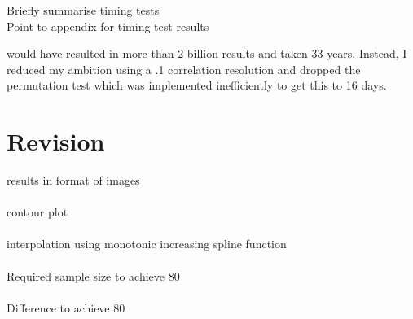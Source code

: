 Briefly summarise timing tests
\\
Point to appendix for timing test results

would have resulted in more than 2 billion results and taken 33 years.  Instead, I reduced my ambition using a .1 correlation resolution and dropped the permutation test which was implemented inefficiently to get this to 16 days.

\section{Revision}
  
results in format of images
\\
\\
contour plot
\\
\\  
interpolation using monotonic increasing spline function
\\
\\
Required sample size to achieve 80%
\\
\\  
Difference to achieve 80%




